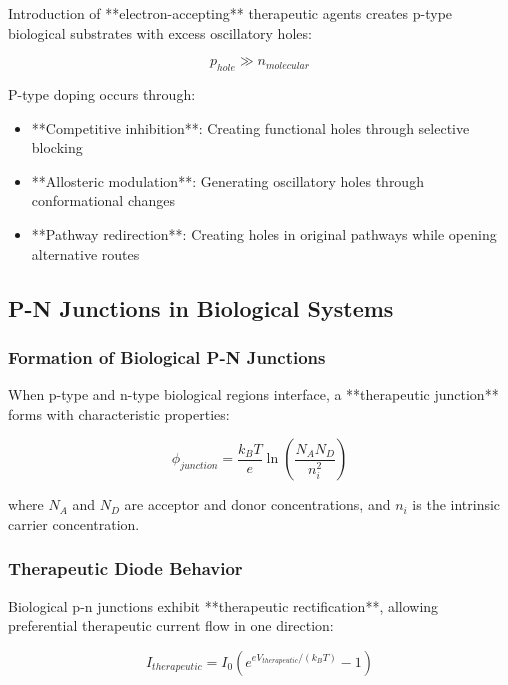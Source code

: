 \documentclass[12pt,a4paper]{article}
\begin{document}
Introduction of **electron-accepting** therapeutic agents creates p-type biological substrates with excess oscillatory holes:

\begin{equation}
p_{hole} \gg n_{molecular}
\end{equation}

P-type doping occurs through:
\begin{itemize}
\item **Competitive inhibition**: Creating functional holes through selective blocking
\item **Allosteric modulation**: Generating oscillatory holes through conformational changes
\item **Pathway redirection**: Creating holes in original pathways while opening alternative routes
\end{itemize}

\subsection{P-N Junctions in Biological Systems}

\subsubsection{Formation of Biological P-N Junctions}

When p-type and n-type biological regions interface, a **therapeutic junction** forms with characteristic properties:

\begin{equation}
\phi_{junction} = \frac{k_B T}{e} \ln\left(\frac{N_A N_D}{n_i^2}\right)
\end{equation}

where $N_A$ and $N_D$ are acceptor and donor concentrations, and $n_i$ is the intrinsic carrier concentration.

\subsubsection{Therapeutic Diode Behavior}

Biological p-n junctions exhibit **therapeutic rectification**, allowing preferential therapeutic current flow in one direction:

\begin{equation}
I_{therapeutic} = I_0 \left(e^{eV_{therapeutic}/(k_B T)} - 1\right)
\end{equation}
\end{document}

